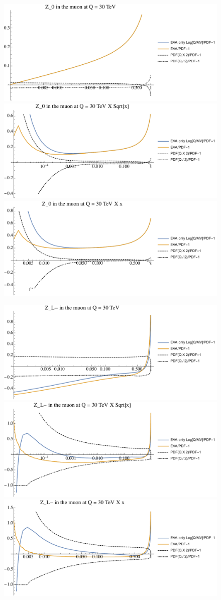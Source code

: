\documentclass[a4paper,11pt]{article}
\begin{document}
\begin{figure}[ht]
\includegraphics[width=0.46\linewidth]{Notebooks/PlotPDFs/ratios/30TeV/Z_0_Q.pdf}
\includegraphics[width=0.46\linewidth]{Notebooks/PlotPDFs/ratios/30TeV/Z_0_Qsqrtx.pdf}
\includegraphics[width=0.46\linewidth]{Notebooks/PlotPDFs/ratios/30TeV/Z_0_Qx.pdf}
\end{figure}

\begin{figure}[ht]
\includegraphics[width=0.46\linewidth]{Notebooks/PlotPDFs/ratios/30TeV/Z_L-_Q.pdf}
\includegraphics[width=0.46\linewidth]{Notebooks/PlotPDFs/ratios/30TeV/Z_L-_Qsqrtx.pdf}
\includegraphics[width=0.46\linewidth]{Notebooks/PlotPDFs/ratios/30TeV/Z_L-_Qx.pdf}
\end{figure}
\end{document}
